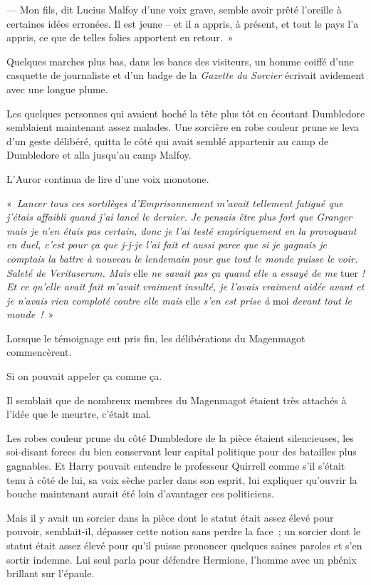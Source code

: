 --- Mon fils, dit Lucius Malfoy d'une voix grave, semble avoir prêté l'oreille à certaines idées erronées.
Il est jeune -- et il a appris, à présent, et tout le pays l'a appris, ce que de telles folies apportent en retour.~»

Quelques marches plus bas, dans les bancs des visiteurs, un homme coiffé d'une casquette de journaliste et d'un badge de la \emph{Gazette du Sorcier} écrivait avidement avec une longue plume.

Les quelques personnes qui avaient hoché la tête plus tôt en écoutant Dumbledore semblaient maintenant assez malades.
Une sorcière en robe couleur prune se leva d'un geste délibéré, quitta le côté qui avait semblé appartenir au camp de Dumbledore et alla jusqu'au camp Malfoy.

L'Auror continua de lire d'une voix monotone.

«~\emph{Lancer tous ces sortilèges d'Emprisonnement m'avait tellement fatigué que j'étais affaibli quand j'ai lancé le dernier.
Je pensais être plus fort que Granger mais je n'en étais pas certain, donc je l'ai testé empiriquement en la provoquant en duel, c'est pour ça que j-j-je l'ai fait et aussi parce que si je gagnais je comptais la battre à nouveau le lendemain pour que tout le monde puisse le voir.
Saleté de Veritaserum.
Mais} elle \emph{ne savait pas ça quand elle a essayé de me} tuer \emph{!
Et ce qu'elle avait fait m'avait vraiment insulté, je l'avais vraiment aidée avant et je n'avais rien comploté contre elle mais} elle \emph{s'en est prise à} moi \emph{devant tout le monde~!}~»

Lorsque le témoignage eut pris fin, les délibérations du Magenmagot commencèrent.

Si on pouvait appeler ça comme ça.

Il semblait que de nombreux membres du Magenmagot étaient très attachés à l'idée que le meurtre, c'était mal.

Les robes couleur prune du côté Dumbledore de la pièce étaient silencieuses, les soi-disant forces du bien conservant leur capital politique pour des batailles plus gagnables.
Et Harry pouvait entendre le professeur Quirrell comme s'il s'était tenu à côté de lui, sa voix sèche parler dans son esprit, lui expliquer qu'ouvrir la bouche maintenant aurait été loin d'avantager ces politiciens.

Mais il y avait un sorcier dans la pièce dont le statut était assez élevé pour pouvoir, semblait-il, dépasser cette notion sans perdre la face~; un sorcier dont le statut était assez élevé pour qu'il puisse prononcer quelques saines paroles et s'en sortir indemne.
Lui seul parla pour défendre Hermione, l'homme avec un phénix brillant sur l'épaule.

